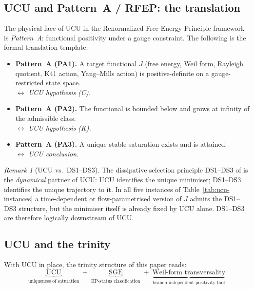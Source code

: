 \documentclass[11pt]{article}
\theoremstyle{definition}
\theoremstyle{remark}
\newtheorem{remark}[theorem]{Remark}
\begin{document}
\subsection{UCU and Pattern~A / RFEP: the translation}
\label{sec:ucu-pattern-a}

The physical face of UCU in the Renormalized Free Energy Principle
framework \cite{RFEPFramework} is \emph{Pattern~A}: functional
positivity under a gauge constraint. The following is the formal
translation template:

\begin{itemize}
\item \textbf{Pattern~A (PA1).} A target functional $J$ (free
energy, Weil form, Rayleigh quotient, K41 action, Yang--Mills
action) is positive-definite on a gauge-restricted state space.\\
$\longleftrightarrow$ \emph{UCU hypothesis (C).}

\item \textbf{Pattern~A (PA2).} The functional is bounded below
and grows at infinity of the admissible class.\\
$\longleftrightarrow$ \emph{UCU hypothesis (K).}

\item \textbf{Pattern~A (PA3).} A unique stable saturation exists
and is attained.\\
$\longleftrightarrow$ \emph{UCU conclusion.}
\end{itemize}

\begin{remark}[UCU vs.\ DS1--DS3]\label{rem:ucu-vs-ds}
The dissipative selection principle DS1--DS3 of
\cite{RFEPFramework} is the \emph{dynamical} partner of UCU: UCU
identifies the unique minimiser; DS1--DS3 identifies the unique
trajectory to it. In all five instances of
Table~\ref{tab:ucu-instances} a time-dependent or flow-parametrised
version of $J$ admits the DS1--DS3 structure, but the minimiser
itself is already fixed by UCU alone. DS1--DS3 are therefore
logically downstream of UCU.
\end{remark}

\subsection{UCU and the trinity}
\label{sec:ucu-trinity}

With UCU in place, the trinity structure of this paper reads:
\[
  \underbrace{\text{UCU}}_{\text{uniqueness of saturation}}
  \;+\;
  \underbrace{\text{SGE}}_{\text{HP-status classification}}
  \;+\;
  \underbrace{\text{Weil-form transversality}}_{\text{branch-independent positivity tool}}
\]
\end{document}
